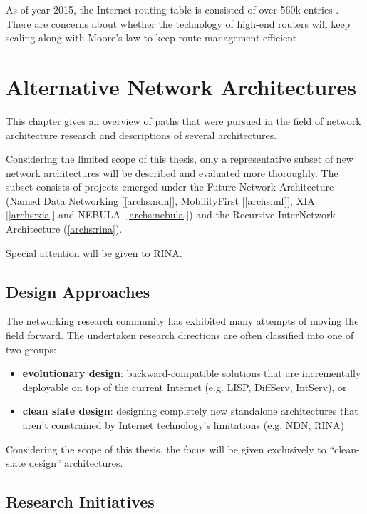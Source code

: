         As of year 2015, the Internet routing table is consisted of over 560k entries \cite{bgpgrow}. There are concerns about whether the technology of high-end routers will keep scaling along with Moore's law to keep route management efficient \cite{rfc4984}.


\chapter{Alternative Network Architectures}\label{archs}

    This chapter gives an overview of paths that were pursued in the field of network architecture research and descriptions of several architectures.

    Considering the limited scope of this thesis, only a representative subset of new network architectures will be described and evaluated more thoroughly. The subset consists of projects emerged under the Future Network Architecture (Named Data Networking [\ref{archs:ndn}], MobilityFirst [\ref{archs:mf}], XIA [\ref{archs:xia}] and NEBULA [\ref{archs:nebula}]) and the Recursive InterNetwork Architecture (\ref{archs:rina}).

    Special attention will be given to RINA.

    \section{Design Approaches}

        The networking research community has exhibited many attempts of moving the field forward. The undertaken research directions are often classified into one of two groups:

        \begin{itemize}
            \item \textbf{evolutionary design}: backward-compatible solutions that are incrementally deployable on top of the current Internet (e.g. LISP, DiffServ, IntServ), or
            \item \textbf{clean slate design}: designing completely new standalone architectures that aren't constrained by Internet technology's limitations (e.g. NDN, RINA)
        \end{itemize}

        Considering the scope of this thesis, the focus will be given exclusively to ``clean-slate design'' architectures.

    \section{Research Initiatives}

